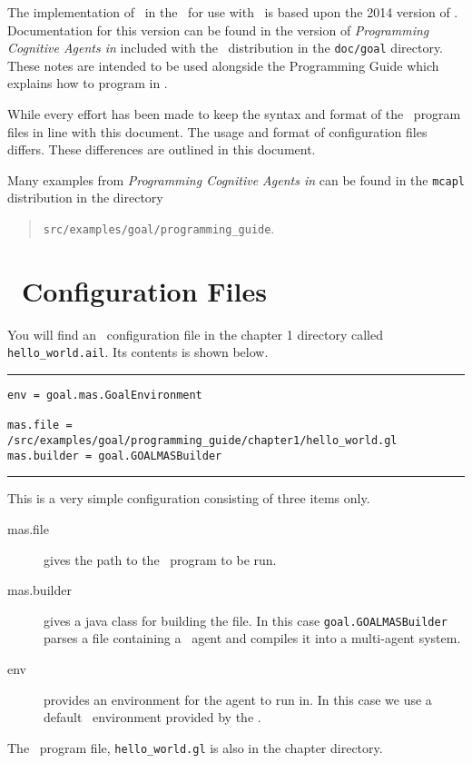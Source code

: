 The implementation of \goal\ in the \ail\ for use with \ajpf\ is based upon the 2014 version of \goal.  Documentation for this version can be found in the version of \emph{Programming Cognitive Agents in \goal} included with the \ajpf\ distribution in the \texttt{doc/goal} directory.  These notes are intended to be used alongside the Programming Guide which explains how to program in \goal.

While every effort has been made to keep the syntax and format of the \goal\ program files in line with this document.  The usage and format of configuration files differs.  These differences are outlined in this document.

Many examples from \emph{Programming Cognitive Agents in \goal} can be found in the \texttt{mcapl} distribution in the directory
\begin{quote}
  \texttt{src/examples/goal/programming\_guide}.
\end{quote}

\section{\ail\ Configuration Files}
\label{sec:config}

\begin{sloppypar}
  You will find an \ail\ configuration file in the chapter 1 directory called \texttt{hello\_world.ail}.  Its contents is shown below.
  \end{sloppypar}

\noindent\rule{\textwidth}{1pt}
\begin{small}
\begin{verbatim}
env = goal.mas.GoalEnvironment

mas.file = /src/examples/goal/programming_guide/chapter1/hello_world.gl
mas.builder = goal.GOALMASBuilder
\end{verbatim}
\end{small}
\rule{\textwidth}{1pt}

This is a very simple configuration consisting of three items only.
\begin{sloppypar}
\begin{description}
\item[mas.file] gives the path to the \goal\ program to be run.
\item[mas.builder] gives a java class for building the file.  In this case \texttt{goal.GOALMASBuilder} parses a file containing a \goal\ agent and compiles it into a multi-agent system.
\item[env] provides an environment for the agent to run in.  In this case we use a default \goal\ environment provided by the \ail.
\end{description}
\end{sloppypar}
The \goal\ program file, \texttt{hello\_world.gl} is also in the chapter directory.

